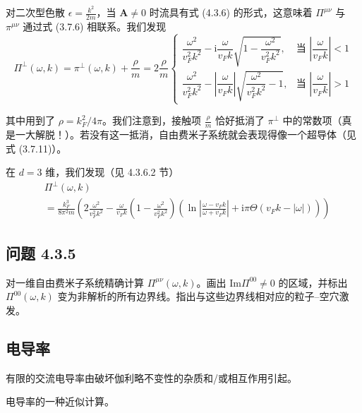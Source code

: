 对二次型色散 $\epsilon=\frac{k^2}{2m}$，当 $\pmb{A}\neq 0$ 时流具有式 (4.3.6) 的形式，这意味着 $\Pi^{\mu\nu}$ 与 $\pi^{\mu\nu}$ 通过式 (3.7.6) 相联系。我们发现
\begin{equation*}
\Pi^{\perp}(\omega,k) = \pi^{\perp}(\omega,k) + \frac{\rho}{m} = 2\frac{\rho}{m}
\left\{
\begin{array}{ll}
\dfrac{\omega^2}{v_F^2k^2} - \mathrm{i}\dfrac{\omega}{v_F k}\sqrt{1-\dfrac{\omega^2}{v_F^2k^2}}, & \text{当 } \left|\dfrac{\omega}{v_F k}\right|<1\\[4ex]
\dfrac{\omega^2}{v_F^2k^2} - \left|\dfrac{\omega}{v_F k}\right|\sqrt{\dfrac{\omega^2}{v_F^2k^2}-1}, & \text{当 } \left|\dfrac{\omega}{v_F k}\right|>1
\end{array}
\right. \tag{4.3.10}
\end{equation*}

其中用到了 $\rho=k_F^2/4\pi$。我们注意到，接触项 $\frac{\rho}{m}$ 恰好抵消了 $\pi^{\perp}$ 中的常数项（真是一大解脱！）。若没有这一抵消，自由费米子系统就会表现得像一个超导体（见式 (3.7.11)）。

在 $d=3$ 维，我们发现（见 4.3.6.2 节）
\begin{align*}
&\Pi^{\perp}(\omega,k) \tag{4.3.11}\\
&= \frac{k_F^3}{8\pi^2 m}\left(2\frac{\omega^2}{v_F^2k^2} - \frac{\omega}{v_F k}\left(1-\frac{\omega^2}{v_F^2k^2}\right)\left(\ln\left|\frac{\omega-v_F k}{\omega+v_F k}\right| + \mathrm{i}\pi\Theta(v_F k-|\omega|)\right)\right)
\end{align*}

\subsection*{问题 4.3.5}

对一维自由费米子系统精确计算 $\Pi^{\mu\nu}(\omega,k)$。画出 $\mathrm{Im}\Pi^{00}\neq 0$ 的区域，并标出 $\Pi^{00}(\omega,k)$ 变为非解析的所有边界线。指出与这些边界线相对应的粒子–空穴激发。

\subsection{电导率}

\begin{keypoints}
\item 有限的交流电导率由破坏伽利略不变性的杂质和/或相互作用引起。
\item 电导率的一种近似计算。
\end{keypoints}

